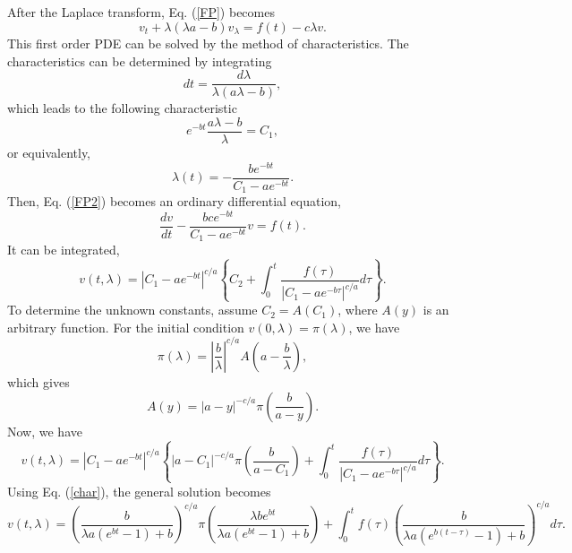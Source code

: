 \documentclass[12pt]{article}
\begin{document}
  After the Laplace transform, Eq. (\ref{FP}) becomes
  \begin{equation}
    v_t + \lambda(\lambda a - b) v_{\lambda} = f(t) - c\lambda v.
    \label{FP2}
  \end{equation}
  This first order PDE can be solved by the method of characteristics.
  The characteristics can be determined by integrating
  \begin{equation}
    dt = \frac{d\lambda}{\lambda(a\lambda - b)},
  \end{equation}
  which leads to the following characteristic
  \begin{equation}
    \label{char}
    e^{-bt}\frac{a\lambda - b}{\lambda} = C_1,
  \end{equation}
  or equivalently,
  \begin{equation}
    \lambda(t) = -\frac{be^{-bt}}{C_1-ae^{-bt}}.
  \end{equation}
  Then, Eq. (\ref{FP2}) becomes an ordinary differential equation,
  \begin{equation}
    \frac{dv}{dt}-\frac{bce^{-bt}}{C_1-ae^{-bt}}v=f(t).
  \end{equation}
  It can be integrated,
  \begin{equation}
    v(t,\lambda) = \left|C_1-ae^{-bt}\right|^{c/a}\left\{C_2+\int_0^t\frac{f(\tau)}{\left|C_1-ae^{-b\tau}\right|^{c/a}}d\tau\right\}.
  \end{equation}
  To determine the unknown constants, assume $C_2=A(C_1)$, where $A(y)$ is an arbitrary function.
  For the initial condition $v(0,\lambda)=\pi(\lambda)$,
  we have
  \begin{equation}
    \pi(\lambda) = \left|\frac{b}{\lambda}\right|^{c/a}A\left(a-\frac{b}{\lambda}\right),
  \end{equation}
  which gives
  \begin{equation}
    A(y) = \left|a-y\right|^{-c/a}\pi\left(\frac{b}{a-y}\right).
  \end{equation}
  Now, we have
  \begin{equation}
    v(t,\lambda) = \left|C_1-ae^{-bt}\right|^{c/a}\left\{\left|a-C_1\right|^{-c/a}
                    \pi\left(\frac{b}{a-C_1}\right)+\int_0^t
                    \frac{f(\tau)}{\left|C_1-ae^{-b\tau}\right|^{c/a}}d\tau\right\}.
  \end{equation}
  Using Eq. (\ref{char}), the general solution becomes
  \begin{equation}
    v(t,\lambda)=\left(\frac{b}{\lambda a(e^{bt}-1)+b}\right)^{c/a}\pi\left(\frac{\lambda be^{bt}}{\lambda a(e^{bt}-1)+b}\right)
                    +\int_0^tf(\tau)\left(\frac{b}{\lambda a(e^{b(t-\tau)}-1)+b}\right)^{c/a}d\tau.
    \label{FP4}
  \end{equation}
\end{document}
